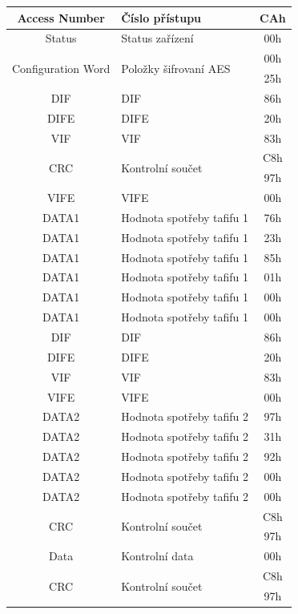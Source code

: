 \begin{table}[!ht]
{\begin{tabular}{|c|l|c|}
Access Number & Číslo přístupu & CAh \\ \hline
Status & Status zařízení & 00h \\ \hline
\multirow{2}{*}{Configuration Word} & \multirow{2}{*}{Položky šifrovaní AES} & 00h \\ \cline{3-3}
 &  & 25h \\ \hline
DIF & DIF & 86h \\ \hline
DIFE & DIFE & 20h \\ \hline
VIF & VIF & 83h \\ \hline
\multirow{2}{*}{CRC}  & \multirow{2}{*}{Kontrolní součet}  & C8h \\ \cline{3-3}
 &  & 97h \\ \hline
VIFE & VIFE & 00h \\ \hline
DATA1 & Hodnota spotřeby tafifu 1 & 76h \\ \hline
DATA1 & Hodnota spotřeby tafifu 1 & 23h \\ \hline
DATA1 & Hodnota spotřeby tafifu 1 & 85h \\ \hline
DATA1 & Hodnota spotřeby tafifu 1 & 01h \\ \hline
DATA1 & Hodnota spotřeby tafifu 1 & 00h \\ \hline
DATA1 & Hodnota spotřeby tafifu 1 & 00h \\ \hline
DIF & DIF & 86h \\ \hline
DIFE & DIFE & 20h \\ \hline
VIF & VIF & 83h \\ \hline
VIFE & VIFE & 00h \\ \hline
DATA2 & Hodnota spotřeby tafifu 2 & 97h \\ \hline
DATA2 & Hodnota spotřeby tafifu 2 & 31h \\ \hline
DATA2 & Hodnota spotřeby tafifu 2 & 92h \\ \hline
DATA2 & Hodnota spotřeby tafifu 2 & 00h \\ \hline
DATA2 & Hodnota spotřeby tafifu 2 & 00h \\ \hline
\multirow{2}{*}{CRC}  & \multirow{2}{*}{Kontrolní součet}  & C8h \\ \cline{3-3}
 &  & 97h \\ \hline
Data & Kontrolní data & 00h \\ \hline
\multirow{2}{*}{CRC}  & \multirow{2}{*}{Kontrolní součet}  & C8h \\ \cline{3-3}
 &  & 97h \\ \hline
\end{tabular}}
\end{table}



